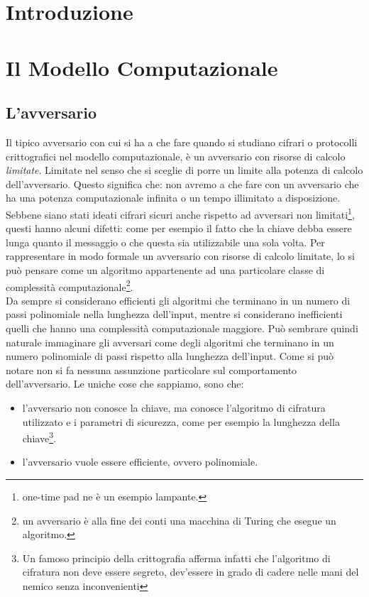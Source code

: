 \documentclass[a4paper,openright,twoside,12pt]{report}
\author{Gian Pietro Farina}
\begin{document}
\chapter*{Introduzione}
\clearpage{\pagestyle{empty}\cleardoublepage}
\chapter{Il Modello Computazionale}
\section{L'avversario}
Il tipico avversario con cui si ha a che fare quando si studiano cifrari o protocolli crittografici nel modello computazionale,
è un avversario con risorse di calcolo \emph{limitate}. Limitate nel senso che si sceglie di porre un limite alla potenza di calcolo dell'avversario.
Questo significa che: non avremo a che fare con un avversario che ha una potenza computazionale infinita o un tempo illimitato a disposizione.
Sebbene siano stati ideati cifrari sicuri anche rispetto ad avversari non limitati\footnote{one-time pad ne \`e un esempio lampante.}, questi hanno alcuni difetti: come per esempio
il fatto che la chiave debba essere lunga quanto il messaggio o che questa sia utilizzabile una sola volta.
Per rappresentare in modo formale un avversario con risorse di calcolo limitate, lo si può pensare come un algoritmo appartenente ad una 
particolare classe di complessit\`a computazionale\footnote{un avversario \`e alla fine dei conti una macchina di Turing che esegue un algoritmo.}. \\
Da sempre si considerano efficienti gli algoritmi che terminano in un numero di passi polinomiale nella lunghezza dell'input, mentre si considerano inefficienti 
quelli che hanno una complessit\`a computazionale maggiore. Pu\`o sembrare quindi naturale immaginare gli avversari come degli algoritmi che terminano in un numero polinomiale di passi
rispetto alla lunghezza dell'input. Come si pu\`o notare non si fa nessuna assunzione particolare sul comportamento dell'avversario. Le uniche cose che sappiamo, sono che:
\begin{itemize}
 \item l'avversario non conosce la chiave, ma conosce l'algoritmo di cifratura utilizzato  e i parametri di sicurezza, come per esempio la lunghezza della chiave\footnote{Un famoso principio della crittografia afferma infatti che
l'algoritmo di cifratura non deve essere segreto, dev'essere in grado di cadere nelle mani del nemico senza inconvenienti}. 
 \item l'avversario vuole essere efficiente, ovvero polinomiale.
\end{itemize}
\end{document}
